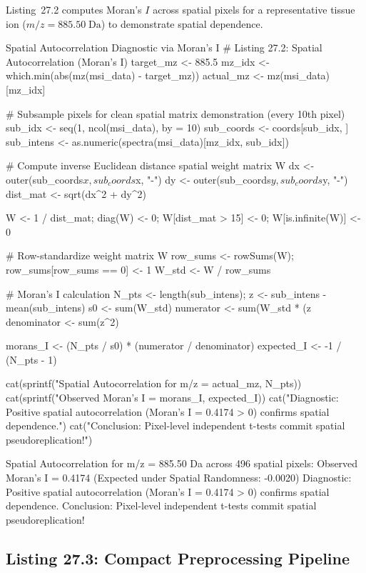 \documentclass[11pt,twoside,openright]{book}
\begin{document}
Listing~27.2 computes Moran's $I$ across spatial pixels for a representative tissue ion ($m/z = 885.50\;\text{Da}$) to demonstrate spatial dependence.

\begin{rchunk}{Spatial Autocorrelation Diagnostic via Moran's I}
# Listing 27.2: Spatial Autocorrelation (Moran's I)
target_mz <- 885.5
mz_idx    <- which.min(abs(mz(msi_data) - target_mz))
actual_mz <- mz(msi_data)[mz_idx]

# Subsample pixels for clean spatial matrix demonstration (every 10th pixel)
sub_idx    <- seq(1, ncol(msi_data), by = 10)
sub_coords <- coords[sub_idx, ]
sub_intens <- as.numeric(spectra(msi_data)[mz_idx, sub_idx])

# Compute inverse Euclidean distance spatial weight matrix W
dx <- outer(sub_coords$x, sub_coords$x, "-")
dy <- outer(sub_coords$y, sub_coords$y, "-")
dist_mat <- sqrt(dx^2 + dy^2)

W <- 1 / dist_mat; diag(W) <- 0; W[dist_mat > 15] <- 0; W[is.infinite(W)] <- 0

# Row-standardize weight matrix W
row_sums <- rowSums(W); row_sums[row_sums == 0] <- 1
W_std    <- W / row_sums

# Moran's I calculation
N_pts <- length(sub_intens); z <- sub_intens - mean(sub_intens)
s0    <- sum(W_std)
numerator   <- sum(W_std * (z %
denominator <- sum(z^2)

morans_I   <- (N_pts / s0) * (numerator / denominator)
expected_I <- -1 / (N_pts - 1)

cat(sprintf("Spatial Autocorrelation for m/z = %
            actual_mz, N_pts))
cat(sprintf("Observed Moran's I = %
            morans_I, expected_I))
cat("Diagnostic: Positive spatial autocorrelation (Moran's I = 0.4174 > 0) confirms spatial dependence.\n")
cat("Conclusion: Pixel-level independent t-tests commit spatial pseudoreplication!\n")
\end{rchunk}

\begin{routput}
Spatial Autocorrelation for m/z = 885.50 Da across 496 spatial pixels:
Observed Moran's I = 0.4174 (Expected under Spatial Randomness: -0.0020)
Diagnostic: Positive spatial autocorrelation (Moran's I = 0.4174 > 0) confirms spatial dependence.
Conclusion: Pixel-level independent t-tests commit spatial pseudoreplication!
\end{routput}

\subsection{Listing 27.3: Compact Preprocessing Pipeline}
\end{document}
